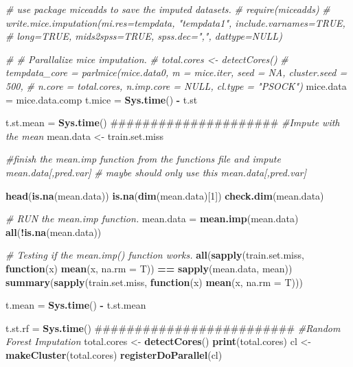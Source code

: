 \documentclass[]{article}
\newenvironment{Shaded}{\begin{snugshade}}{\end{snugshade}}
\newcommand{\KeywordTok}[1]{\textcolor[rgb]{0.13,0.29,0.53}{\textbf{#1}}}
\newcommand{\DataTypeTok}[1]{\textcolor[rgb]{0.13,0.29,0.53}{#1}}
\newcommand{\DecValTok}[1]{\textcolor[rgb]{0.00,0.00,0.81}{#1}}
\newcommand{\StringTok}[1]{\textcolor[rgb]{0.31,0.60,0.02}{#1}}
\newcommand{\CommentTok}[1]{\textcolor[rgb]{0.56,0.35,0.01}{\textit{#1}}}
\newcommand{\ControlFlowTok}[1]{\textcolor[rgb]{0.13,0.29,0.53}{\textbf{#1}}}
\newcommand{\OperatorTok}[1]{\textcolor[rgb]{0.81,0.36,0.00}{\textbf{#1}}}
\newcommand{\NormalTok}[1]{#1}
\begin{document}
\begin{Shaded}
\begin{Highlighting}[]
  \CommentTok{# use package miceadds to save the imputed datasets. }
  \CommentTok{# require(miceadds)}
  \CommentTok{# write.mice.imputation(mi.res=tempdata, "tempdata1", include.varnames=TRUE,}
  \CommentTok{#       long=TRUE, mids2spss=TRUE, spss.dec=",", dattype=NULL)}
  
  \CommentTok{# # Parallalize mice imputation. }
  \CommentTok{# total.cores <- detectCores()}
  \CommentTok{# tempdata_core = parlmice(mice.data0, m = mice.iter, seed = NA, cluster.seed = 500, }
  \CommentTok{#                          n.core = total.cores,  n.imp.core = NULL, cl.type = "PSOCK")}
\NormalTok{  mice.data =}\StringTok{ }\NormalTok{mice.data.comp}
\NormalTok{  t.mice =}\StringTok{ }\KeywordTok{Sys.time}\NormalTok{() }\OperatorTok{-}\StringTok{ }\NormalTok{t.st}
  
  
\NormalTok{  t.st.mean =}\StringTok{ }\KeywordTok{Sys.time}\NormalTok{()}
\NormalTok{  #####################}
  \CommentTok{#Impute with the mean}
\NormalTok{  mean.data <-}\StringTok{ }\NormalTok{train.set.miss}
  
  \CommentTok{#finish the mean.imp function from the functions file and impute mean.data[,pred.var] }
  \CommentTok{# maybe should only use this mean.data[,pred.var] }
  
  \KeywordTok{head}\NormalTok{(}\KeywordTok{is.na}\NormalTok{(mean.data))}
  \KeywordTok{is.na}\NormalTok{(}\KeywordTok{dim}\NormalTok{(mean.data)[}\DecValTok{1}\NormalTok{])}
  \KeywordTok{check.dim}\NormalTok{(mean.data)}
  
  \CommentTok{# RUN the mean.imp function. }
\NormalTok{  mean.data =}\StringTok{ }\KeywordTok{mean.imp}\NormalTok{(mean.data)}
  \KeywordTok{all}\NormalTok{(}\OperatorTok{!}\KeywordTok{is.na}\NormalTok{(mean.data))}
  
  \CommentTok{# Testing if the mean.imp() function works. }
  \KeywordTok{all}\NormalTok{(}\KeywordTok{sapply}\NormalTok{(train.set.miss, }\ControlFlowTok{function}\NormalTok{(x) }\KeywordTok{mean}\NormalTok{(x, }\DataTypeTok{na.rm  =}\NormalTok{ T)) }\OperatorTok{==}\StringTok{ }\KeywordTok{sapply}\NormalTok{(mean.data, mean))}
  \KeywordTok{summary}\NormalTok{(}\KeywordTok{sapply}\NormalTok{(train.set.miss, }\ControlFlowTok{function}\NormalTok{(x) }\KeywordTok{mean}\NormalTok{(x, }\DataTypeTok{na.rm  =}\NormalTok{ T)))}
  
\NormalTok{  t.mean =}\StringTok{ }\KeywordTok{Sys.time}\NormalTok{() }\OperatorTok{-}\StringTok{ }\NormalTok{t.st.mean}
  
\NormalTok{  t.st.rf =}\StringTok{ }\KeywordTok{Sys.time}\NormalTok{()}
\NormalTok{  #########################}
  \CommentTok{#Random Forest Imputation}
\NormalTok{  total.cores <-}\StringTok{ }\KeywordTok{detectCores}\NormalTok{()}
  \KeywordTok{print}\NormalTok{(total.cores)}
\NormalTok{  cl <-}\StringTok{ }\KeywordTok{makeCluster}\NormalTok{(total.cores)}
  \KeywordTok{registerDoParallel}\NormalTok{(cl)}
  

\end{Highlighting}
\end{Shaded}
\end{document}
